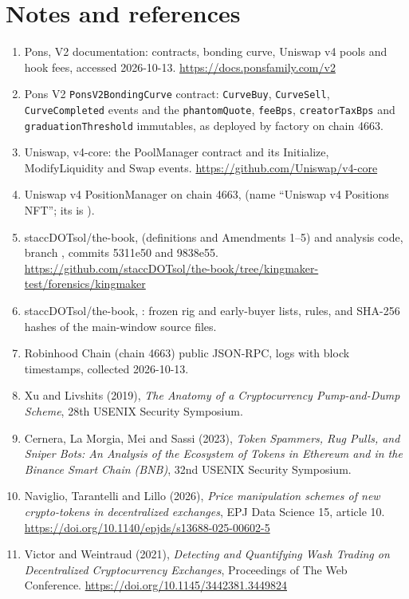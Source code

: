 \documentclass{ledger}
\begin{document}
\section*{Notes and references}
\begin{enumerate}
\item Pons, V2 documentation: contracts, bonding curve, Uniswap v4 pools and hook fees, accessed 2026-10-13. \url{https://docs.ponsfamily.com/v2}
\item Pons V2 \texttt{PonsV2BondingCurve} contract: \texttt{CurveBuy}, \texttt{CurveSell}, \texttt{CurveCompleted} events and the \texttt{phantomQuote}, \texttt{feeBps}, \texttt{creatorTaxBps} and \texttt{graduationThreshold} immutables, as deployed by factory  on chain 4663.
\item Uniswap, v4-core: the PoolManager contract and its Initialize, ModifyLiquidity and Swap events. \url{https://github.com/Uniswap/v4-core}
\item Uniswap v4 PositionManager on chain 4663,  (name ``Uniswap v4 Positions NFT''; its  is ).
\item staccDOTsol/the-book,  (definitions and Amendments 1--5) and analysis code, branch , commits 5311e50 and 9838e55. \url{https://github.com/staccDOTsol/the-book/tree/kingmaker-test/forensics/kingmaker}
\item staccDOTsol/the-book, : frozen rig and early-buyer lists, rules, and SHA-256 hashes of the main-window source files.
\item Robinhood Chain (chain 4663) public JSON-RPC, logs with block timestamps, collected 2026-10-13.
\item Xu and Livshits (2019), \emph{The Anatomy of a Cryptocurrency Pump-and-Dump Scheme}, 28th USENIX Security Symposium.
\item Cernera, La Morgia, Mei and Sassi (2023), \emph{Token Spammers, Rug Pulls, and Sniper Bots: An Analysis of the Ecosystem of Tokens in Ethereum and in the Binance Smart Chain (BNB)}, 32nd USENIX Security Symposium.
\item Naviglio, Tarantelli and Lillo (2026), \emph{Price manipulation schemes of new crypto-tokens in decentralized exchanges}, EPJ Data Science 15, article 10. \url{https://doi.org/10.1140/epjds/s13688-025-00602-5}
\item Victor and Weintraud (2021), \emph{Detecting and Quantifying Wash Trading on Decentralized Cryptocurrency Exchanges}, Proceedings of The Web Conference. \url{https://doi.org/10.1145/3442381.3449824}

\end{enumerate}
\end{document}
